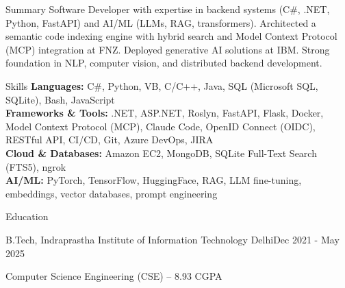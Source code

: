 \documentclass[10pt]{resume}
\begin{document}
    \begin{rSection}{Summary}
        Software Developer with expertise in backend systems (C\#, .NET, Python, FastAPI) and AI/ML (LLMs, RAG, transformers). Architected a semantic code indexing engine with hybrid search and Model Context Protocol (MCP) integration at FNZ. Deployed generative AI solutions at IBM. Strong foundation in NLP, computer vision, and distributed backend development.
    \end{rSection}

    \begin{rSection}{Skills}
        \textbf{Languages:} C\#, Python, VB, C/C++, Java, SQL (Microsoft SQL, SQLite), Bash, JavaScript \\
        \textbf{Frameworks \& Tools:} .NET, ASP.NET, Roslyn, FastAPI, Flask, Docker, Model Context Protocol (MCP), Claude Code, OpenID Connect (OIDC), RESTful API, CI/CD, Git, Azure DevOps, JIRA \\
        \textbf{Cloud \& Databases:} Amazon EC2, MongoDB, SQLite Full-Text Search (FTS5), ngrok \\
        \textbf{AI/ML:} PyTorch, TensorFlow, HuggingFace, RAG, LLM fine-tuning, embeddings, vector databases, prompt engineering
    \end{rSection}

    \begin{rSection}{Education}
        \begin{rSubsection}{B.Tech, Indraprastha Institute of Information Technology Delhi}{Dec 2021 - May 2025}
            \item Computer Science Engineering (CSE) -- 8.93 CGPA
        \end{rSubsection}
    \end{rSection}
\end{document}
